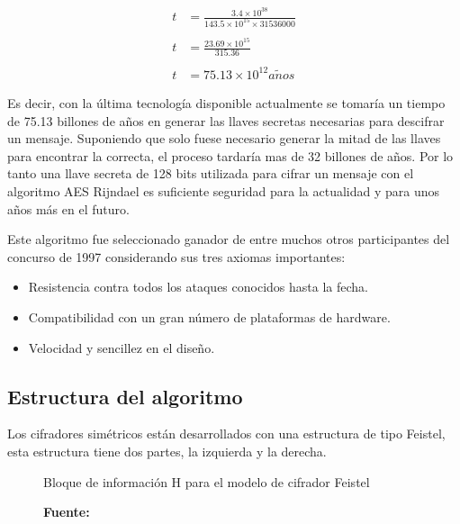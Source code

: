 \documentclass[../main/main.tex]{subfiles}
\begin{document}
  \vspace{-0.7cm}\begin{equation}
    \begin{aligned}
    t &= \frac{3.4 \times 10^{38}}{143.5 \times 10^{15} \times 31536000} \\
    \\
    t &= \frac{23.69 \times 10^{15}}{315.36} \\
    \\
    t &= 75.13 \times 10^{12} a\tilde{n}os
    \end{aligned}
  \end{equation}

  Es decir, con la última tecnología disponible actualmente se tomaría un tiempo de 75.13 billones de años en generar las llaves secretas necesarias para descifrar un mensaje. Suponiendo que solo fuese necesario generar la mitad de las llaves para encontrar la correcta, el proceso tardaría mas de 32 billones de años. Por lo tanto una llave secreta de 128 bits utilizada para cifrar un mensaje con el algoritmo AES Rijndael es suficiente seguridad para la actualidad y para unos años más en el futuro.

  Este algoritmo fue seleccionado ganador de entre muchos otros participantes del concurso de 1997 considerando sus tres axiomas importantes:

  \begin{itemize}[noitemsep,nolistsep]
    \item Resistencia contra todos los ataques conocidos hasta la fecha.
    \item Compatibilidad con un gran número de plataformas de hardware.
    \item Velocidad y sencillez en el diseño.
  \end{itemize}

  \subsection{Estructura del algoritmo}

    Los cifradores simétricos están desarrollados con una estructura de tipo Feistel, esta estructura tiene dos partes, la izquierda y la derecha.

    \begin{figure}[H]
      \centering
      \caption{Bloque de información H para el modelo de cifrador Feistel}
      
      \caption*{\textbf{Fuente:} \cite{report:seguridad_europea_eeuu}}
    \end{figure}
\end{document}
